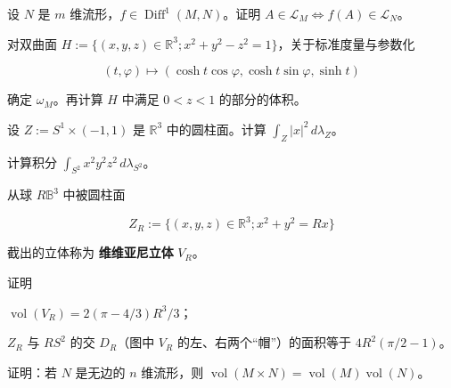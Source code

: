 \exerciseshead

\begin{exercises}
\item

设 $ N $ 是 $ m $ 维流形，$ f\in\operatorname{Diff}^{1}(M,N) $。证明 $ A\in\mathcal{L}_{M} \iff f(A)\in\mathcal{L}_{N} $。

\item

对双曲面 $ H:=\{(x,y,z)\in\mathbb{R}^{3} ; x^{2}+y^{2}-z^{2}=1\} $，关于标准度量与参数化

\[
(t,\varphi)\mapsto(\cosh t\cos\varphi,\cosh t\sin\varphi,\sinh t)
\]

确定 $ \omega_{M} $。再计算 $ H $ 中满足 $ 0<z<1 $ 的部分的体积。

\item

设 $ Z:=S^{1}\times(-1,1) $ 是 $ \mathbb{R}^{3} $ 中的圆柱面。计算 $ \int_{Z}|x|^{2}\,d\lambda_{Z} $。

\item

计算积分 $ \int_{S^{2}}x^{2}y^{2}z^{2}\,d\lambda_{S^{2}} $。

\item

从球 $ R\mathbb{B}^{3} $ 中被圆柱面

\[
Z_{R}:=\{(x,y,z)\in\mathbb{R}^{3} ; x^{2}+y^{2}=Rx\}
\]

截出的立体称为 \textbf{维维亚尼立体} $ V_{R} $。


证明

\begin{subitems}
\item

$ \operatorname{vol}(V_{R})=2(\pi-4/3)R^{3}/3 $；

\item

$ Z_{R} $ 与 $ RS^{2} $ 的交 $ D_{R} $（图中 $ V_{R} $ 的左、右两个“帽”）的面积等于 $ 4R^{2}(\pi/2-1) $。

\end{subitems}

\item

证明：若 $ N $ 是无边的 $ n $ 维流形，则 $ \operatorname{vol}(M\times N)=\operatorname{vol}(M)\operatorname{vol}(N) $。

\item


\end{exercises}
